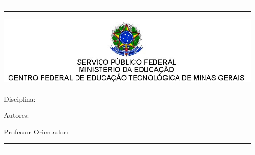     \noindent\rule{19cm}{0.15cm}
    
    \noindent\rule{19cm}{0.1mm}
    
    \begin{center}
    
        \includegraphics[scale=0.95]{Imagens/cabecalho.jpg}\\[0.2cm]
                
        {\bf \Large \MakeUppercase \thetitle}\\[0.2cm]
                
        Disciplina: \disciplina
        
        Autores: \theauthor
        
        Professor Orientador: \professor    
    
    \end{center}
    
    \noindent\rule{19cm}{0.1mm}
    
    \noindent\rule{19cm}{0.15cm}